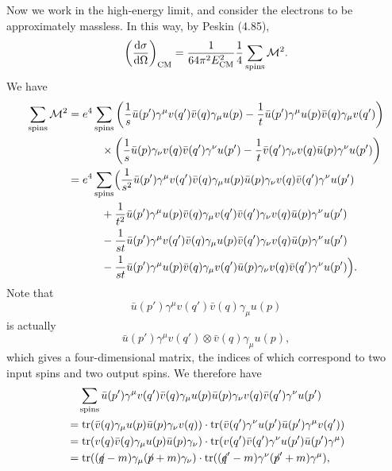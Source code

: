 \documentclass[hyperref, a4paper]{article}
\newcommand{\fsl}[1]{{\centernot{#1}}}
\begin{document}
Now we work in the high-energy limit, and consider the electrons to be approximately massless. In this way, by 
Peskin (4.85),
\[
    \left( \dv{\sigma}{\Omega} \right)_\text{CM} = \frac{1}{64 \pi^2 E_\text{CM}^2} \frac{1}{4} \sum_\text{spins} \mathcal{M}^2.
\]
We have 
\begin{equation}
    \begin{aligned}
        \sum_\text{spins} \mathcal{M}^2 &= e^4 \sum_\text{spins} \left( \frac{1}{s} \bar{u}(p') \gamma^\mu v(q') \bar{v}(q) \gamma_\mu u(p) - \frac{1}{t} \bar{u}(p') \gamma^\mu u(p) \bar{v}(q) \gamma_\mu v(q') \right) \\
        &\quad \quad \quad \times \left( \frac{1}{s} \bar{u}(p) \gamma_\nu v(q) \bar{v}(q') \gamma^\nu u(p') - \frac{1}{t} \bar{v}(q') \gamma_\nu v(q) \bar{u}(p) \gamma^\nu u(p') \right) \\
        &= e^4 \sum_\text{spins} \Bigl( \frac{1}{s^2} \bar{u}(p') \gamma^\mu v(q') \bar{v}(q) \gamma_\mu u(p) \bar{u}(p) \gamma_\nu v(q) \bar{v}(q') \gamma^\nu u(p') \\
        &\quad \quad \quad + \frac{1}{t^2} \bar{u}(p') \gamma^\mu u(p) \bar{v}(q) \gamma_\mu v(q') \bar{v}(q') \gamma_\nu v(q) \bar{u}(p) \gamma^\nu u(p') \\
        &\quad \quad \quad - \frac{1}{st} \bar{u}(p') \gamma^\mu v(q') \bar{v}(q) \gamma_\mu u(p) \bar{v}(q') \gamma_\nu v(q) \bar{u}(p) \gamma^\nu u(p') \\
        &\quad \quad \quad - \frac{1}{st} \bar{u}(p') \gamma^\mu u(p) \bar{v}(q) \gamma_\mu v(q') \bar{u}(p) \gamma_\nu v(q) \bar{v}(q') \gamma^\nu u(p') \Bigr). 
    \end{aligned}
    \label{eq:3-m-expansion}
\end{equation}
Note that 
\[
    \bar{u}(p') \gamma^\mu v(q') \bar{v}(q) \gamma_\mu u(p)
\]
is actually 
\[
    \bar{u}(p') \gamma^\mu v(q') \otimes \bar{v}(q) \gamma_\mu u(p),
\]
which gives a four-dimensional matrix, the indices of which correspond to two input spins and two output spins.
We therefore have 
\[
    \begin{aligned}
        &\quad \sum_\text{spins} \bar{u}(p') \gamma^\mu v(q') \bar{v}(q) \gamma_\mu u(p) \bar{u}(p) \gamma_\nu v(q) \bar{v}(q') \gamma^\nu u(p') \\
        &= \trace(\bar{v}(q) \gamma_\mu u(p) \bar{u}(p) \gamma_\nu v(q)) \cdot \trace(\bar{v}(q') \gamma^\nu u(p') \bar{u}(p') \gamma^\mu v(q')) \\
        &= \trace( v(q) \bar{v}(q) \gamma_\mu u(p) \bar{u}(p) \gamma_\nu ) \cdot \trace( v(q') \bar{v}(q') \gamma^\nu u(p') \bar{u}(p') \gamma^\mu ) \\
        &= \trace( (\fsl{q} - m) \gamma_\mu (\fsl{p} + m) \gamma_\nu ) \cdot \trace( (\fsl{q}' - m) \gamma^\nu (\fsl{p}' + m) \gamma^\mu ),
    \end{aligned}
\]
\end{document}
